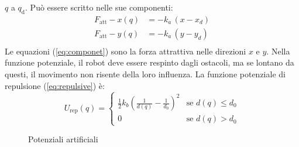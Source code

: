 $q$ a $q_{\text{d}}$. Può essere scritto nelle sue componenti:
\begin{equation}
\label{eq:componet}
\begin{split}
F_{\text{att}} -x(q) &= -k_a \, (x - x_d)\\
F_{\text{att}} -y(q) &= -k_a \, (y - y_d)\\
\end{split}
\end{equation}
%
Le equazioni (\ref{eq:componet}) sono la forza attrattiva nelle direzioni $x$ 
e $y$. Nella funzione potenziale, il robot deve essere respinto dagli ostacoli, 
ma se lontano da questi, il movimento non risente della loro influenza.
La funzione potenziale di repulsione (\ref{eq:repulsive}) è:
\begin{equation}
\label{eq:repulsive}
U_{\text{rep}}(q) = 
\begin{cases} 
\frac{1}{2}k_b(\frac{1}{d(q)}-\frac{1}{d_0})^2 &\mbox{se } d(q) \leq d_0 \\ 
0 & \mbox{se } d(q) > d_0
\end{cases} 
\end{equation}
\begin{figure*}[htb]
\centering
{} \quad
{} 
\caption{Potenziali artificiali}
\label{fig:potentialfield}
\end{figure*}

